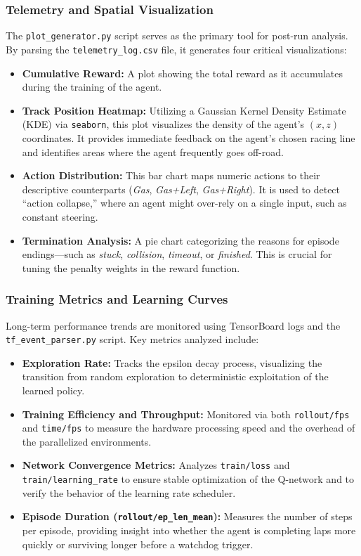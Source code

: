 \documentclass[11pt,a4paper]{article}
\begin{document}
\subsubsection{Telemetry and Spatial Visualization}
The \texttt{plot\_generator.py} script serves as the primary tool for post-run analysis. By parsing the \texttt{telemetry\_log.csv} file, it generates four critical visualizations:
\begin{itemize}
    \item \textbf{Cumulative Reward:} A plot showing the total reward as it accumulates during the training of the agent.
    \item \textbf{Track Position Heatmap:} Utilizing a Gaussian Kernel Density Estimate (KDE) via \texttt{seaborn}, this plot visualizes the density of the agent's $(x, z)$ coordinates. It provides immediate feedback on the agent's chosen racing line and identifies areas where the agent frequently goes off-road.
    \item \textbf{Action Distribution:} This bar chart maps numeric actions to their descriptive counterparts (\textit{Gas}, \textit{Gas+Left}, \textit{Gas+Right}). It is used to detect ``action collapse,'' where an agent might over-rely on a single input, such as constant steering.
    \item \textbf{Termination Analysis:} A pie chart categorizing the reasons for episode endings—such as \textit{stuck}, \textit{collision}, \textit{timeout}, or \textit{finished}. This is crucial for tuning the penalty weights in the reward function.
\end{itemize}

\subsubsection{Training Metrics and Learning Curves}
Long-term performance trends are monitored using TensorBoard logs and the \texttt{tf\_event\_parser.py} script. Key metrics analyzed include:
\begin{itemize}
    \item \textbf{Exploration Rate:} Tracks the epsilon decay process, visualizing the transition from random exploration to deterministic exploitation of the learned policy.
    \item \textbf{Training Efficiency and Throughput:} Monitored via both \texttt{rollout/fps} and \texttt{time/fps} to measure the hardware processing speed and the overhead of the parallelized environments.
    \item \textbf{Network Convergence Metrics:} Analyzes \texttt{train/loss} and \texttt{train/learning\_rate} to ensure stable optimization of the Q-network and to verify the behavior of the learning rate scheduler.
    \item \textbf{Episode Duration (\texttt{rollout/ep\_len\_mean}):} Measures the number of steps per episode, providing insight into whether the agent is completing laps more quickly or surviving longer before a watchdog trigger.
\end{itemize}
\end{document}
